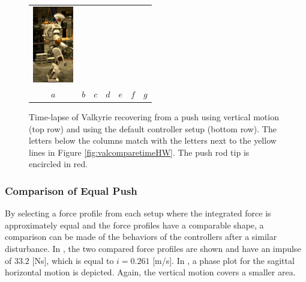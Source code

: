 \begin{figure}
\begin{tabular}{ccccccc}
    \includegraphics[width=0.7in]{STYLESTUFF/val7d_30} \\
    $a$&
    $b$&
    $c$&
    $d$&
    $e$&
    $f$&
    $g$\\
  \end{tabular}
  \caption{Time-lapse of Valkyrie recovering from a push using vertical motion (top row) and using the default controller setup (bottom row). The letters below the columns match with the letters next to the yellow lines in Figure \ref{fig:valcomparetimeHW}. The push rod tip is encircled in red.}
  \label{fig:val}
\end{figure}

\subsubsection{Comparison of Equal Push} 
By selecting a force profile from each setup where the integrated force is approximately equal and the force profiles have a comparable shape, a comparison can be made of the behaviors of the controllers after a similar disturbance. In , the two compared force profiles are shown and have an impulse of $33.2$ [Ns], which is equal to $i=0.261$ [m/s]. In , a phase plot for the sagittal horizontal motion is depicted. Again, the vertical motion covers a smaller area. 

